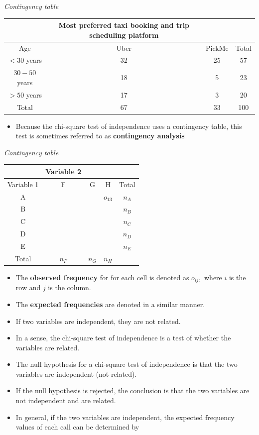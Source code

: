\documentclass[]{book}
\providecommand{\tightlist}{%
  \setlength{\itemsep}{0pt}\setlength{\parskip}{0pt}}
\begin{document}
\emph{Contingency table}

\begin{longtable}[]{@{}cccc@{}}
\toprule
& Most preferred taxi booking and trip scheduling platform & &\tabularnewline
\midrule
\endhead
Age & Uber & PickMe & Total\tabularnewline
\(< 30\) years & 32 & 25 & 57\tabularnewline
\(30-50\) years & 18 & 5 & 23\tabularnewline
\(> 50\) years & 17 & 3 & 20\tabularnewline
Total & 67 & 33 & 100\tabularnewline
\bottomrule
\end{longtable}

\begin{itemize}
\tightlist
\item
  Because the chi-square test of independence uses a contingency table, this test is sometimes referred to as \textbf{contingency analysis}
\end{itemize}

\emph{Contingency table}

\begin{longtable}[]{@{}ccccc@{}}
\toprule
& Variable 2 & & &\tabularnewline
\midrule
\endhead
Variable 1 & F & G & H & Total\tabularnewline
A & & & \(o_{13}\) & \(n_A\)\tabularnewline
B & & & & \(n_B\)\tabularnewline
C & & & & \(n_C\)\tabularnewline
D & & & & \(n_D\)\tabularnewline
E & & & & \(n_E\)\tabularnewline
Total & \(n_F\) & \(n_G\) & \(n_H\) &\tabularnewline
\bottomrule
\end{longtable}

\begin{itemize}
\item
  The \textbf{observed frequency} for for each cell is denoted as \(o_{ij},\) where \(i\) is the row and \(j\) is the column.
\item
  The \textbf{expected frequencies} are denoted in a similar manner.
\item
  If two variables are independent, they are not related.
\item
  In a sense, the chi-square test of independence is a test of whether the variables are related.
\item
  The null hypothesis for a chi-square test of independence is that the two variables are independent (not related).
\item
  If the null hypothesis is rejected, the conclusion is that the two variables are not independent and are related.
\item
  In general, if the two variables are independent, the expected frequency values of each call can be determined by
\end{itemize}
\end{document}
